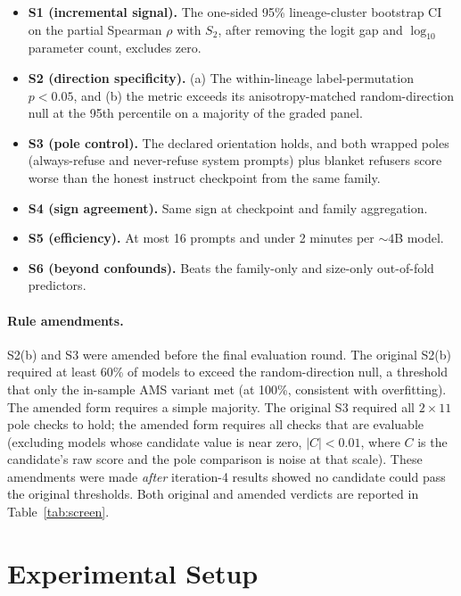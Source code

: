 \documentclass[11pt,letterpaper]{article}
\begin{document}
\begin{itemize}
\item \textbf{S1 (incremental signal).} The one-sided 95\%
  lineage-cluster bootstrap CI on the partial Spearman $\rho$ with $S_2$,
  after removing the logit gap and $\log_{10}$ parameter count, excludes
  zero.
\item \textbf{S2 (direction specificity).} (a) The within-lineage
  label-permutation $p < 0.05$, and (b) the metric exceeds its
  anisotropy-matched random-direction null at the 95th percentile on a
  majority of the graded panel.
\item \textbf{S3 (pole control).} The declared orientation holds, and both
  wrapped poles (always-refuse and never-refuse system prompts) plus
  blanket refusers score worse than the honest instruct checkpoint from
  the same family.
\item \textbf{S4 (sign agreement).} Same sign at checkpoint and family
  aggregation.
\item \textbf{S5 (efficiency).} At most 16 prompts and under 2 minutes per
  ${\sim}4$B model.
\item \textbf{S6 (beyond confounds).} Beats the family-only and size-only
  out-of-fold predictors.
\end{itemize}

\paragraph{Rule amendments.}
S2(b) and S3 were amended before the final evaluation round. The original
S2(b) required at least 60\% of models to exceed the random-direction
null, a threshold that only the in-sample AMS variant met (at 100\%,
consistent with overfitting). The amended form requires a simple majority.
The original S3 required all $2 \times 11$ pole checks to hold; the
amended form requires all checks that are evaluable (excluding models
whose candidate value is near zero, $|C| < 0.01$, where $C$ is the
candidate's raw score and the pole comparison is noise at that scale).
These amendments were made \emph{after} iteration-4 results showed no
candidate could pass the original thresholds. Both original and amended
verdicts are reported in Table~\ref{tab:screen}.

\section{Experimental Setup}
\end{document}
